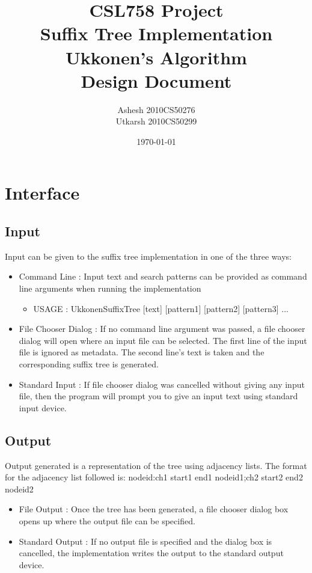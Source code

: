 \documentclass[a4paper]{article}
\title{CSL758 Project \\Suffix Tree Implementation \\Ukkonen's Algorithm \\Design Document}
\author{Ashesh 2010CS50276 \\ Utkarsh 2010CS50299}
\date{\today}
\begin{document}
\maketitle

\section{Interface}
\subsection {Input}
Input can be given to the suffix tree implementation in one of the three ways:
\begin{itemize}
\item Command Line : Input text and search patterns can be provided as command line arguments when running the implementation \begin{itemize}
\item USAGE : UkkonenSuffixTree [text] [pattern1] [pattern2] [pattern3] ...
\end{itemize}
\item File Chooser Dialog : If no command line argument was passed, a file chooser dialog will open where an input file can be selected. The first line of the input file is ignored as metadata. The second line's text is taken and the corresponding suffix tree is generated. 
\item Standard Input : If file chooser dialog was cancelled without giving any input file, then the program will prompt you to give an input text using standard input device.
\end{itemize}

\subsection {Output}
Output generated is a representation of the tree using adjacency lists. The format for the adjacency list followed is: \newline \newline
nodeid:ch1 start1 end1 nodeid1;ch2 start2 end2 nodeid2
\begin{itemize}
\item File Output : Once the tree has been generated, a file chooser dialog box opens up where the output file can be specified.
\item Standard Output : If no output file is specified and the dialog box is cancelled, the implementation writes the output to the standard output device.
\end{itemize}
\end{document}
